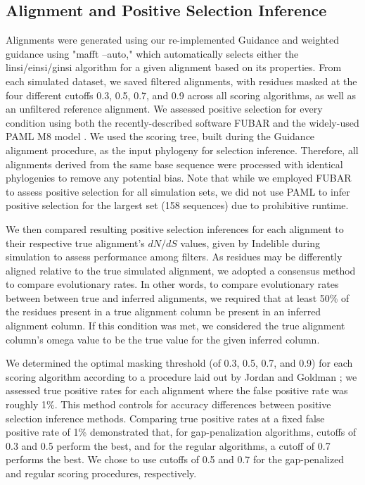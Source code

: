 \documentclass[10pt]{article}
\begin{document}
\subsection*{Alignment and Positive Selection Inference}
Alignments were generated using our re-implemented Guidance and weighted guidance using "mafft --auto," which automatically selects either the linsi/einsi/ginsi algorithm for a given alignment based on its properties. From each simulated dataset, we saved filtered alignments, with residues masked at the four different cutoffs 0.3, 0.5, 0.7, and 0.9 across all scoring algorithms, as well as an unfiltered reference alignment.  We assessed positive selection for every condition using both the recently-described software FUBAR \citep{Murrell2013} and the widely-used PAML M8 model \citep{Yang2007}. We used the scoring tree, built during the Guidance alignment procedure, as the input phylogeny for selection inference. Therefore, all alignments derived from the same base sequence were processed with identical phylogenies to remove any potential bias. Note that while we employed FUBAR to assess positive selection for all simulation sets, we did not use PAML to infer positive selection for the largest set (158 sequences) due to prohibitive runtime.

We then compared resulting positive selection inferences for each alignment to their respective true alignment's $dN/dS$ values, given by Indelible during simulation to assess performance among filters. As residues may be differently aligned relative to the true simulated alignment, we adopted a consensus method to compare evolutionary rates. In other words, to compare evolutionary rates between between true and inferred alignments, we required that at least 50\% of the residues present in a true alignment column be present in an inferred alignment column. If this condition was met, we considered the true alignment column’s omega value to be the true value for the given inferred column.

We determined the optimal masking threshold (of 0.3, 0.5, 0.7, and 0.9) for each scoring algorithm according to a procedure laid out by Jordan and Goldman \citep{Jordan2011}; we assessed true positive rates for each alignment where the false positive rate was roughly 1\%. This method controls for accuracy differences between positive selection inference methods. Comparing true positive rates at a fixed false positive rate of 1\% demonstrated that, for gap-penalization algorithms, cutoffs of 0.3 and 0.5 perform the best, and for the regular algorithms, a cutoff of 0.7 performs the best. We chose to use cutoffs of 0.5 and 0.7 for the gap-penalized and regular scoring procedures, respectively.
\end{document}
